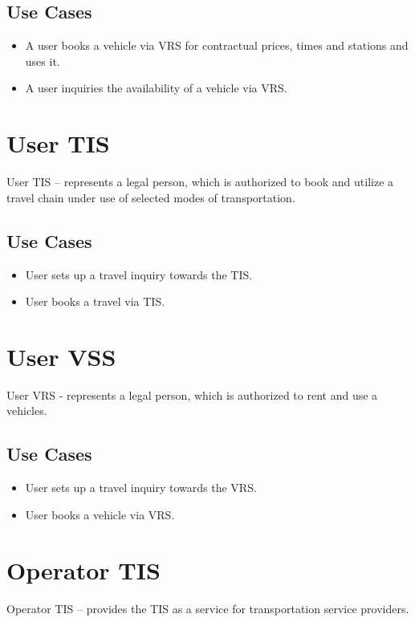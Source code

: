 \subsection*{Use Cases}
\begin{itemize}
\item A user books a vehicle via VRS for contractual prices, times and stations and uses it.
\item A user inquiries the availability of a vehicle via VRS. 
\end{itemize}

\section*{User TIS}
User TIS – represents a legal person, which is authorized to book and utilize a travel chain under use of selected modes of transportation.

\subsection*{Use Cases}
\begin{itemize}
\item User sets up a travel inquiry towards the TIS.
\item User books a travel via TIS.
\end{itemize}

\section*{User VSS}
User VRS - represents a legal person, which is authorized to rent and use a vehicles.

\subsection*{Use Cases}
\begin{itemize}
\item User sets up a travel inquiry towards the VRS.
\item User books a vehicle via VRS.
\end{itemize}

\section*{Operator TIS}
Operator TIS – provides the TIS as a service for transportation service providers.



